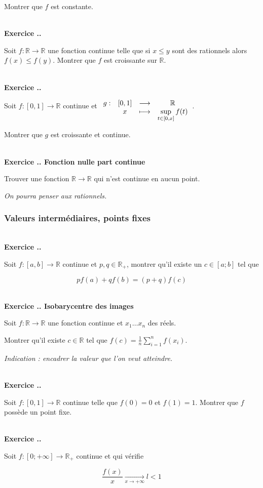 \documentclass{article}
\newcommand{\fonction}[5]{\raisebox{-0.5\baselineskip}{$\begin{array}{lccc}
    #1: & #2 & \longrightarrow & #3 \\
        & #4 & \longmapsto & #5 \end{array}$}}
\newcommand{\mb}[1]{\mathbb{#1}}
\newcounter{exo}
\newcommand{\exercice}[1][\null]{\textbf{\\ Exercice \thesection.\theexo. #1} \addtocounter{exo}{1}}
\begin{document}
Montrer que $f$ est constante.

\exercice

Soit $f : \mb{R} \rightarrow \mb{R}$ une fonction continue telle que si $ x \le y$ sont des rationnels alors $f(x) \le f(y)$. Montrer que $f$ est croissante sur $\mb{R}$.


\exercice

Soit $f : [0,1] \rightarrow \mb{R}$ continue et $\fonction{g}{[0,1]}{\mb{R}}{x}{\displaystyle \sup_{t \in [0,x]} f(t)}$.

Montrer que $g$ est croissante et continue.

\exercice[Fonction nulle part continue]

Trouver une fonction $\mb{R} \rightarrow \mb{R}$ qui n'est continue en aucun point.

\emph{On pourra penser aux rationnels.}




\subsubsection{Valeurs intermédiaires, points fixes}

\exercice

Soit $f : [a,b] \to \mb{R}$ continue et $p,q \in \mb{R}_+$, montrer 
qu'il existe un $c \in [a;b]$ tel que 

\begin{equation*}
    p f(a) + q f(b) = (p + q) f (c)
\end{equation*}


\exercice[Isobarycentre des images]

Soit $f : \mb{R} \rightarrow \mb{R}$ une fonction continue et $x_1 \dots x_n$ des réels.

Montrer qu'il existe $c \in \mb{R}$ tel que $\displaystyle f(c) = \frac{1}{n} \sum_{i=1}^n f(x_i)$.

\emph{Indication : encadrer la valeur que l'on veut atteindre.}


\exercice

Soit $f : [0,1] \rightarrow \mb{R}$ continue telle que $f(0) = 0$ et $f(1) = 1$. Montrer que $f$ possède un point fixe.

\exercice

Soit $f : [0; + \infty] \to \mb{R}_+$ continue et qui vérifie

\begin{equation*}
    \frac{f(x)}{x} \underset{x \to +\infty}{\xrightarrow{\quad\quad\quad}} l < 1
\end{equation*}
\end{document}
